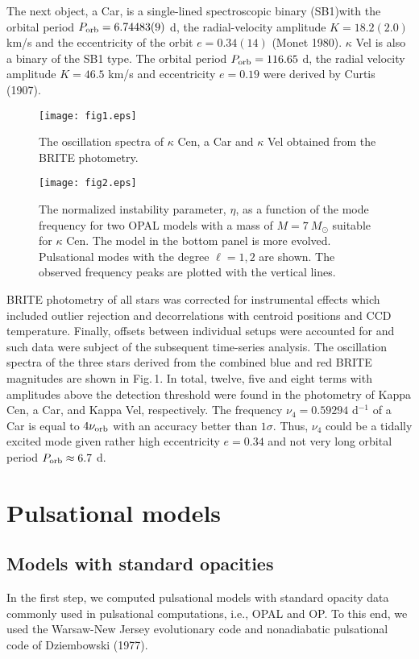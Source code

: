 \documentclass{ptapap}
\begin{document}
The next object, a Car, is a single-lined spectroscopic binary (SB1)with the orbital period $P_{\rm orb}=6.74483(9)$ d,
the radial-velocity amplitude $K=18.2(2.0)$ km/s and the eccentricity of the orbit $e=0.34(14)$ (Monet 1980).
$\kappa$ Vel is also a binary of the SB1 type. The orbital period $P_{\rm orb}=116.65$ d, the radial velocity amplitude $K=46.5$ km/s
and eccentricity $e=0.19$ were derived by Curtis (1907).
%
\begin{figure}[h]
\centering
\begin{minipage}{0.48\textwidth}
   \texttt{[image: fig1.eps]}
   \caption{The oscillation spectra of $\kappa$ Cen, a Car and $\kappa$ Vel obtained from the BRITE photometry.}
   \label{fig:osc_freq}
\end{minipage}
 \quad
  \begin{minipage}{0.48\textwidth}
    \texttt{[image: fig2.eps]}
    \caption{The normalized instability parameter, $\eta$, as a function of the mode frequency for two OPAL models with a mass of $M=7~M_\odot$ suitable for $\kappa$ Cen.
     The model in the bottom panel is more evolved. Pulsational modes with the degree $\ell=1,2$ are shown. The observed frequency peaks are plotted with the vertical lines.}
    \label{fig:fig2}
  \end{minipage}
\end{figure}

BRITE photometry of all stars was corrected for instrumental effects which included outlier rejection and decorrelations with centroid positions and CCD temperature. Finally, offsets between individual setups were accounted for and such data were subject of the subsequent time-series analysis.
The oscillation spectra of the three stars derived from the combined blue and red BRITE magnitudes are shown in Fig.\,1.
In total, twelve, five and eight terms with amplitudes above the detection threshold were found in the photometry of Kappa Cen, a Car, and Kappa Vel, respectively.
The frequency $\nu_4=0.59294$ d$^{-1}$ of a Car is equal to $4\nu_{\rm orb}$ with an accuracy better than $1\sigma$.
Thus, $\nu_4$ could be a tidally excited mode given rather high eccentricity $e=0.34$ and not very long orbital period $P_{\rm orb}\approx 6.7$ d.


\section{Pulsational models}

\subsection{Models with standard opacities}
In the first step, we computed pulsational models with standard opacity data
commonly used in pulsational computations, i.e., OPAL and OP.
To this end, we used the Warsaw-New Jersey evolutionary code and nonadiabatic pulsational code of Dziembowski (1977).
\end{document}
